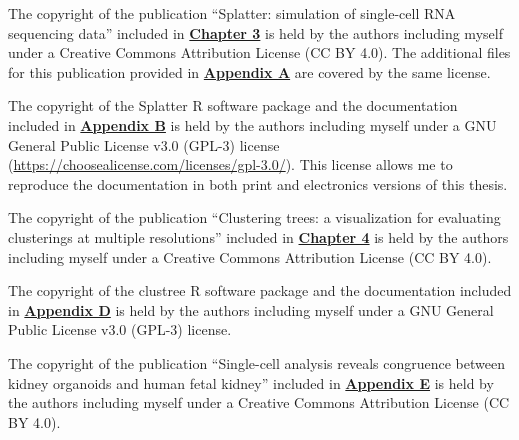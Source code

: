 \documentclass[11pt,a4paper,titlepage,twoside,openright]{style/unimelbthesis}
\theoremstyle{definition}
\theoremstyle{definition}
\theoremstyle{definition}
\theoremstyle{remark}
\begin{document}
\begin{frontmatter}
\begin{copyrightlist}
    The copyright of the publication ``Splatter: simulation of single-cell RNA sequencing data'' included in \textbf{\protect\hyperlink{simulation}{Chapter 3}} is held by the authors including myself under a Creative Commons Attribution License (CC BY 4.0). The additional files for this publication provided in \textbf{\protect\hyperlink{splatter-additional}{Appendix A}} are covered by the same license.
    
    The copyright of the Splatter R software package and the documentation included in \textbf{\protect\hyperlink{splatter-docs}{Appendix B}} is held by the authors including myself under a GNU General Public License v3.0 (GPL-3) license (\url{https://choosealicense.com/licenses/gpl-3.0/}). This license allows me to reproduce the documentation in both print and electronics versions of this thesis.
    
    The copyright of the publication ``Clustering trees: a visualization for evaluating clusterings at multiple resolutions'' included in \textbf{\protect\hyperlink{clust-trees}{Chapter 4}} is held by the authors including myself under a Creative Commons Attribution License (CC BY 4.0).
    
    The copyright of the clustree R software package and the documentation included in \textbf{\protect\hyperlink{clustree-docs}{Appendix D}} is held by the authors including myself under a GNU General Public License v3.0 (GPL-3) license.
    
    The copyright of the publication ``Single-cell analysis reveals congruence between kidney organoids and human fetal kidney'' included in \textbf{\protect\hyperlink{organoid-paper}{Appendix E}} is held by the authors including myself under a Creative Commons Attribution License (CC BY 4.0).
  \end{copyrightlist}

\end{frontmatter}

%
\end{document}
